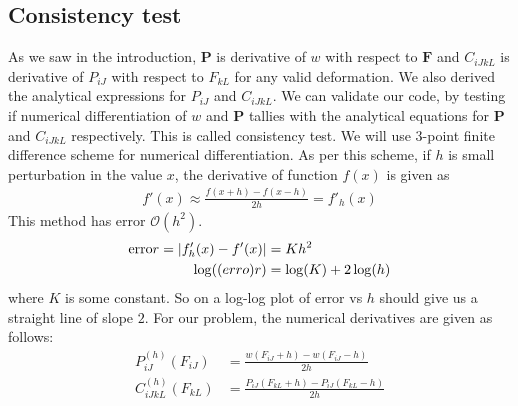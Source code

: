\documentclass[../main.tex]{subfiles}
\begin{document}
\subsection{Consistency test}
\label{sec:consistency}
As we saw in the introduction, $\mathbf{P}$ is derivative of $w$ with
respect to $\mathbf{F}$ and $C_{iJkL}$ is derivative of $P_{iJ}$ with
respect to $F_{kL}$ for any valid deformation. We also derived the
analytical expressions for $P_{iJ}$ and $C_{iJkL}$. We can validate
our code, by testing if numerical differentiation of $w$ and
$\mathbf{P}$ tallies with the analytical equations for $\mathbf{P}$
and $C_{iJkL}$ respectively. This is called consistency test.  We will
use 3-point finite difference scheme for numerical differentiation. As
per this scheme, if $h$ is small perturbation in the value $x$, the
derivative of function $f(x)$ is given as
\begin{align*}
  f'(x) \approx \frac{f(x+h)-f(x-h)}{2h} = f'_h(x)
\end{align*}
This method has error $\mathcal{O}(h^2)$.
\begin{align*}
  \text{erro}r = |f'_h(x) - f'(x)| &= Kh^2\\
  \log(\text(erro)r) &= \log(K) + 2\log(h)\\
\end{align*}
where $K$ is some constant. So on a log-log plot of $\text{error}$ vs $h$
should give us a straight line of slope $2$.  For our problem, the
numerical derivatives are given as follows:
\begin{align*}
  P^{(h)}_{iJ}(F_{iJ}) &= \frac{w(F_{iJ}+h) - w(F_{iJ}-h)}{2h}\\
  C^{(h)}_{iJkL}(F_{kL})&=\frac{P_{iJ}(F_{kL}+h) - P_{iJ}(F_{kL}-h)}{2h}\\
\end{align*}
\end{document}
